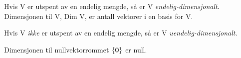 Hvis V er utspent av en endelig mengde,
så er V \emph{endelig-dimensjonalt}.
Dimensjonen til V, Dim V, er antall vektorer i en basis for V.

Hvis V \emph{ikke} er utspent av en endelig mengde,
så er V \emph{uendelig-dimensjonalt}.

Dimensjonen til nullvektorrommet $\{\mathbf{0}\}$ er null.
